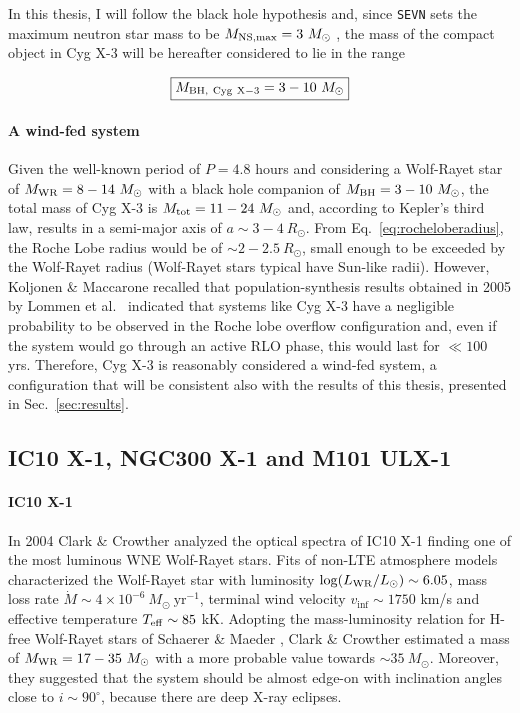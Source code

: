 \documentclass[a4paper,titlepage]{book}     	%
\newcommand{\sun}{\ensuremath{_\odot}}
\newcommand{\mdot}{\ensuremath{\dot{M}}}
\newcommand{\msun}{\ensuremath{M\sun}}
\newcommand{\rsun}{R_{\odot}}
\newcommand{\lsun}{L_{\odot}}
\newcommand{\yr}{\text{yr}}
\newcommand{\mwr}{\ensuremath{M_\textup{WR}}}
\newcommand{\mbh}{\ensuremath{M_\textup{BH}}}
\begin{document}
In this thesis, I will follow the black hole hypothesis and, since \texttt{SEVN} sets the maximum neutron star mass to be  $M_{\rm NS,max} = 3~\msun$ \cite{spera2019_mergingBBH}, the mass of the compact object in Cyg X-3 will be hereafter considered to lie in the range

\begin{equation}\label{eq:MBHCygX3}
    \boxed{M_{\rm BH,~Cyg~X-3} = 3-10~\msun}
\end{equation}

\paragraph{A wind-fed system} Given the well-known period of $P=4.8$ hours and considering a Wolf-Rayet star of $\mwr = 8-14~\msun$ with a black hole companion of $\mbh = 3-10~\msun$, the total mass of Cyg X-3 is $M_{\rm tot} = 11 - 24~\msun$ and, according to Kepler's third law, results in a semi-major axis of $a \sim 3-4~\rsun$. From Eq.\ \ref{eq:rocheloberadius}, the Roche Lobe radius would be of $\sim 2-2.5~\rsun$, small enough to be exceeded by the Wolf-Rayet radius (Wolf-Rayet stars typical have Sun-like radii). However, Koljonen \& Maccarone \cite{CygX-3_Koljonen2017} recalled that population-synthesis results obtained in 2005 by Lommen et al.\ \cite{CygX-3_Lommen2005_Ppdot} indicated that systems like Cyg X-3 have a negligible probability to be observed in the Roche lobe overflow configuration and, even if the system would go through an active RLO phase, this would last for $\ll 100~$ yrs. Therefore, Cyg X-3 is reasonably considered a wind-fed system, a configuration that will be consistent also with the results of this thesis, presented in Sec.\ \ref{sec:results}. 




\subsection{IC10 X-1, NGC300 X-1 and M101 ULX-1}\label{subsec:IC10X1_revisedmasses}

\paragraph{IC10 X-1} In 2004 Clark \& Crowther \cite{IC10X-1_Clark2004_WRmass} analyzed the optical spectra of IC10 X-1 finding one of the most luminous WNE Wolf-Rayet stars. Fits of non-LTE atmosphere models characterized the Wolf-Rayet star with luminosity $\log(L_{\rm WR}/\lsun) \sim 6.05$, mass loss rate $\mdot \sim 4 \times 10^{-6}~\msun~\yr^{-1}$, terminal wind velocity $v_{\inf} \sim 1750$ km/s and effective temperature $T_{\rm eff} \sim 85$ kK. Adopting the mass-luminosity relation for H-free Wolf-Rayet stars of Schaerer \& Maeder \cite{schaerer1992MLrelationWR}, Clark \& Crowther estimated a mass of $\mwr = 17-35~\msun$ with a more probable value towards $\sim 35~\msun$. Moreover, they suggested that the system should be almost edge-on with inclination angles close to $i \sim 90^{\circ}$, because there are deep X-ray eclipses.
\end{document}
